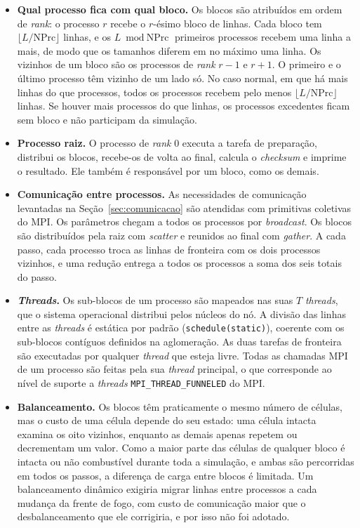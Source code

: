 \documentclass[11pt,a4paper]{article}
\begin{document}
\begin{itemize}
    \item \textbf{Qual processo fica com qual bloco.} Os blocos são atribuídos em ordem de \emph{rank}: o processo $r$ recebe o $r$-ésimo bloco de linhas. Cada bloco tem $\lfloor L/\text{NPrc} \rfloor$ linhas, e os $L \bmod \text{NPrc}$ primeiros processos recebem uma linha a mais, de modo que os tamanhos diferem em no máximo uma linha. Os vizinhos de um bloco são os processos de \emph{rank} $r-1$ e $r+1$. O primeiro e o último processo têm vizinho de um lado só. No caso normal, em que há mais linhas do que processos, todos os processos recebem pelo menos $\lfloor L/\text{NPrc} \rfloor$ linhas. Se houver mais processos do que linhas, os processos excedentes ficam sem bloco e não participam da simulação.
    \item \textbf{Processo raiz.} O processo de \emph{rank} 0 executa a tarefa de preparação, distribui os blocos, recebe-os de volta ao final, calcula o \emph{checksum} e imprime o resultado. Ele também é responsável por um bloco, como os demais.
    \item \textbf{Comunicação entre processos.} As necessidades de comunicação levantadas na Seção~\ref{sec:comunicacao} são atendidas com primitivas coletivas do MPI. Os parâmetros chegam a todos os processos por \emph{broadcast}. Os blocos são distribuídos pela raiz com \emph{scatter} e reunidos ao final com \emph{gather}. A cada passo, cada processo troca as linhas de fronteira com os dois processos vizinhos, e uma redução entrega a todos os processos a soma dos seis totais do passo.
    \item \textbf{\emph{Threads}.} Os sub-blocos de um processo são mapeados nas suas $T$ \emph{threads}, que o sistema operacional distribui pelos núcleos do nó. A divisão das linhas entre as \emph{threads} é estática por padrão (\texttt{schedule(static)}), coerente com os sub-blocos contíguos definidos na aglomeração. As duas tarefas de fronteira são executadas por qualquer \emph{thread} que esteja livre. Todas as chamadas MPI de um processo são feitas pela sua \emph{thread} principal, o que corresponde ao nível de suporte a \emph{threads} \texttt{MPI\_THREAD\_FUNNELED} do MPI.
    \item \textbf{Balanceamento.} Os blocos têm praticamente o mesmo número de células, mas o custo de uma célula depende do seu estado: uma célula intacta examina os oito vizinhos, enquanto as demais apenas repetem ou decrementam um valor. Como a maior parte das células de qualquer bloco é intacta ou não combustível durante toda a simulação, e ambas são percorridas em todos os passos, a diferença de carga entre blocos é limitada. Um balanceamento dinâmico exigiria migrar linhas entre processos a cada mudança da frente de fogo, com custo de comunicação maior que o desbalanceamento que ele corrigiria, e por isso não foi adotado.

\end{itemize}
\end{document}
